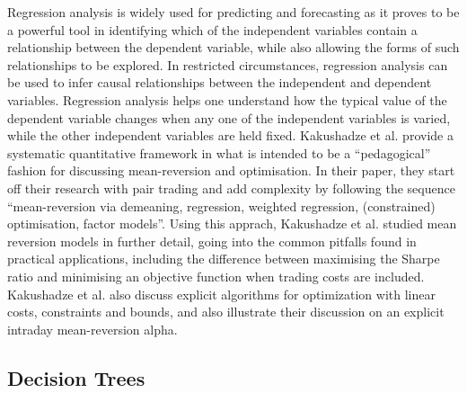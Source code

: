 Regression analysis is widely used for predicting and forecasting as it proves to be a powerful tool in identifying which of the independent variables contain a relationship between the dependent variable, while also allowing the forms of such relationships to be explored. In restricted circumstances, regression analysis can be used to infer causal relationships between the independent and dependent variables. Regression analysis helps one understand how the typical value of the dependent variable changes when any one of the independent variables is varied, while the other independent variables are held fixed. Kakushadze et al. provide a systematic quantitative framework in what is intended to be a “pedagogical” fashion for discussing mean-reversion and optimisation.\cite{Kakushadze:2015aa} In their paper, they start off their research with pair trading and add complexity by following the sequence “mean-reversion via demeaning, regression, weighted regression, (constrained) optimisation, factor models”. Using this apprach, Kakushadze et al. studied mean reversion models in further detail, going into the common pitfalls found in practical applications, including the difference between maximising the Sharpe ratio and minimising an objective function when trading costs are included. Kakushadze et al. also discuss explicit algorithms for optimization with linear costs, constraints and bounds, and also illustrate their discussion on an explicit intraday mean-reversion alpha.

\subsection{Decision Trees}

